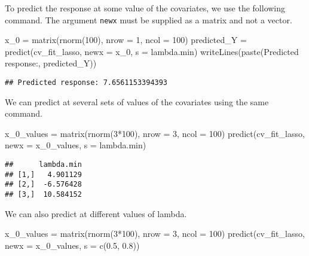 \documentclass[
]{book}
\newenvironment{Shaded}{\begin{snugshade}}{\end{snugshade}}
\newcommand{\AttributeTok}[1]{\textcolor[rgb]{0.77,0.63,0.00}{#1}}
\newcommand{\DecValTok}[1]{\textcolor[rgb]{0.00,0.00,0.81}{#1}}
\newcommand{\FloatTok}[1]{\textcolor[rgb]{0.00,0.00,0.81}{#1}}
\newcommand{\FunctionTok}[1]{\textcolor[rgb]{0.00,0.00,0.00}{#1}}
\newcommand{\NormalTok}[1]{#1}
\newcommand{\OtherTok}[1]{\textcolor[rgb]{0.56,0.35,0.01}{#1}}
\newcommand{\SpecialCharTok}[1]{\textcolor[rgb]{0.00,0.00,0.00}{#1}}
\newcommand{\StringTok}[1]{\textcolor[rgb]{0.31,0.60,0.02}{#1}}
\begin{document}
To predict the response at some value of the covariates, we use the following command. The argument \texttt{newx} must be supplied as a matrix and not a vector.

\begin{Shaded}
\begin{Highlighting}[]
\NormalTok{x\_0 }\OtherTok{=} \FunctionTok{matrix}\NormalTok{(}\FunctionTok{rnorm}\NormalTok{(}\DecValTok{100}\NormalTok{), }\AttributeTok{nrow =} \DecValTok{1}\NormalTok{, }\AttributeTok{ncol =} \DecValTok{100}\NormalTok{)}
\NormalTok{predicted\_Y }\OtherTok{=} \FunctionTok{predict}\NormalTok{(cv\_fit\_lasso, }\AttributeTok{newx =}\NormalTok{ x\_0, }\AttributeTok{s =} \StringTok{\textquotesingle{}lambda.min\textquotesingle{}}\NormalTok{)}
\FunctionTok{writeLines}\NormalTok{(}\FunctionTok{paste}\NormalTok{(}\StringTok{\textquotesingle{}Predicted response:\textquotesingle{}}\NormalTok{, predicted\_Y))}
\end{Highlighting}
\end{Shaded}

\begin{verbatim}
## Predicted response: 7.6561153394393
\end{verbatim}

We can predict at several sets of values of the covariates using the same command.

\begin{Shaded}
\begin{Highlighting}[]
\NormalTok{x\_0\_values }\OtherTok{=} \FunctionTok{matrix}\NormalTok{(}\FunctionTok{rnorm}\NormalTok{(}\DecValTok{3}\SpecialCharTok{*}\DecValTok{100}\NormalTok{), }\AttributeTok{nrow =} \DecValTok{3}\NormalTok{, }\AttributeTok{ncol =} \DecValTok{100}\NormalTok{)}
\FunctionTok{predict}\NormalTok{(cv\_fit\_lasso, }\AttributeTok{newx =}\NormalTok{ x\_0\_values, }\AttributeTok{s =} \StringTok{\textquotesingle{}lambda.min\textquotesingle{}}\NormalTok{)}
\end{Highlighting}
\end{Shaded}

\begin{verbatim}
##      lambda.min
## [1,]   4.901129
## [2,]  -6.576428
## [3,]  10.584152
\end{verbatim}

We can also predict at different values of lambda.

\begin{Shaded}
\begin{Highlighting}[]
\NormalTok{x\_0\_values }\OtherTok{=} \FunctionTok{matrix}\NormalTok{(}\FunctionTok{rnorm}\NormalTok{(}\DecValTok{3}\SpecialCharTok{*}\DecValTok{100}\NormalTok{), }\AttributeTok{nrow =} \DecValTok{3}\NormalTok{, }\AttributeTok{ncol =} \DecValTok{100}\NormalTok{)}
\FunctionTok{predict}\NormalTok{(cv\_fit\_lasso, }\AttributeTok{newx =}\NormalTok{ x\_0\_values, }\AttributeTok{s =} \FunctionTok{c}\NormalTok{(}\FloatTok{0.5}\NormalTok{, }\FloatTok{0.8}\NormalTok{))}
\end{Highlighting}
\end{Shaded}
\end{document}

